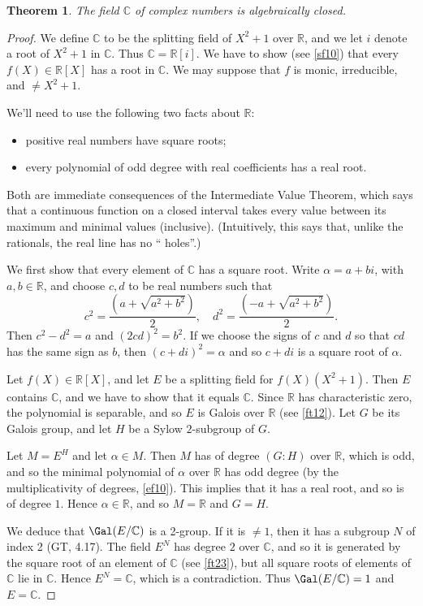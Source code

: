 \documentclass[a4paper,11pt,final,openany]{memoir}
\newtheorem{theorem}[X]{Theorem}
\theoremstyle{nonumberplain}
\newtheorem{proof}{Proof.}
\begin{document}
\begin{theorem}
\label{ag5}The field $\mathbb{C}$ of complex numbers is algebraically closed.
\end{theorem}

\begin{proof}
We define $\mathbb{C}$ to be the splitting field of $X^{2}+1$ over
$\mathbb{R}{}$, and we let $i$ denote a root of $X^{2}+1$ in $\mathbb{C}$.
Thus $\mathbb{C}=\mathbb{R}[i]$. We have to show (see \ref{sf10}) that every
$f(X)\in\mathbb{R}[X]$ has a root in $\mathbb{C}$. We may suppose that $f$ is
monic, irreducible, and $\neq X^{2}+1$.

We'll need to use the following two facts about $\mathbb{R}$:

\begin{itemize}
\item positive real numbers have square roots;

\item every polynomial of odd degree with real coefficients has a real root.
\end{itemize}

\noindent Both are immediate consequences of the Intermediate Value Theorem,
which says that a continuous function on a closed interval takes every value
between its maximum and minimal values (inclusive). (Intuitively, this says
that, unlike the rationals, the real line has no \textquotedblleft
holes\textquotedblright.)

We first show that every element of $\mathbb{C}$ has a square root. Write
$\alpha=a+bi$, with $a,b\in\mathbb{R}$, and choose $c,d$ to be real numbers
such that
\[
c^{2}=\frac{(a+\sqrt{a^{2}+b^{2}})}{2},\quad d^{2}=\frac{(-a+\sqrt{a^{2}%
+b^{2}})}{2}.
\]
Then $c^{2}-d^{2}=a$ and $(2cd)^{2}=b^{2}$. If we choose the signs of $c$ and
$d$ so that $cd$ has the same sign as $b$, then $(c+di)^{2}=\alpha$ and so
$c+di$ is a square root of $\alpha$.

Let $f(X)\in\mathbb{R}[X]$, and let $E$ be a splitting field for
$f(X)(X^{2}+1)$. Then $E$ contains $\mathbb{C}{}$, and we have to show that it
equals $\mathbb{C}{}$. Since $\mathbb{R}$ has characteristic zero, the
polynomial is separable, and so $E$ is Galois over $\mathbb{R}$ (see
\ref{ft12}). Let $G$ be its Galois group, and let $H$ be a Sylow $2$-subgroup
of $G$.

Let $M=E^{H}$ and let $\alpha\in M$. Then $M$ has of degree $(G\colon H)$ over
$\mathbb{R}$, which is odd, and so the minimal polynomial of $\alpha$ over
$\mathbb{R}{}$ has odd degree (by the multiplicativity of degrees,
\ref{ef10}). This implies that it has a real root, and so is of degree $1$.
Hence $\alpha\in\mathbb{R}{}$, and so $M=\mathbb{R}{}$ and $G=H$.

We deduce that $\Gal(E/\mathbb{C})$ is a 2-group. If it is $\neq1$, then it
has a subgroup $N$ of index 2 (GT, 4.17). The field $E^{N}$ has
degree $2$ over $\mathbb{C}$, and so it is generated by the square root of an
element of $\mathbb{C}$ (see \ref{ft23}), but all square roots of elements of
$\mathbb{C}{}$ lie in $\mathbb{C}$. Hence $E^{N}=\mathbb{C}$, which is a
contradiction. Thus $\Gal(E/\mathbb{C})=1$ and $E=\mathbb{C}$.
\end{proof}
\end{document}

